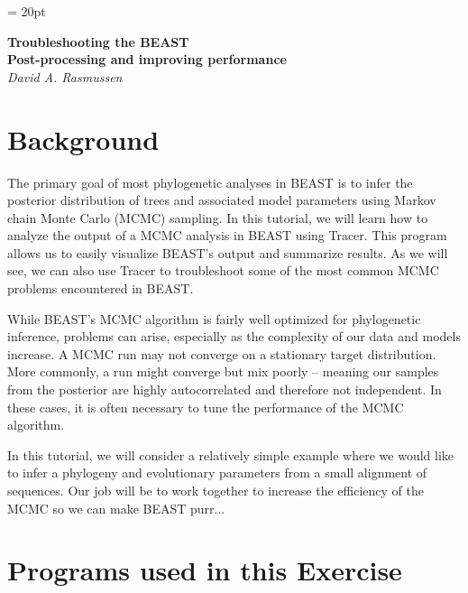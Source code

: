 \documentclass[11pt]{article}
\begin{document}
\renewcommand{\headrulewidth}{0.5pt}
\headsep = 20pt
\lhead{ }

\thispagestyle{plain}

\begin{center}
\textbf{\LARGE Troubleshooting the BEAST}\\\vspace{2mm}
\textbf{\textcolor{mycol}{\Large Post-processing and improving performance}}\\
\vspace{4mm}
{\Large {\em David A. Rasmussen}}
\end{center}

\bigskip
\section{Background}

The primary goal of most phylogenetic analyses in BEAST is to infer the posterior distribution of trees and associated model parameters using Markov chain Monte Carlo (MCMC) sampling. In this tutorial, we will learn how to analyze the output of a MCMC analysis in BEAST using Tracer. This program allows us to easily visualize BEAST's output and summarize results. As we will see, we can also use Tracer to troubleshoot some of the most common MCMC problems  encountered in BEAST.

While BEAST's MCMC algorithm is fairly well optimized for phylogenetic inference, problems can arise, especially as the complexity of our data and models increase. A MCMC run may not converge on a stationary target distribution. More commonly, a run might converge but mix poorly -- meaning our samples from the posterior are highly autocorrelated and therefore not independent. In these cases, it is often necessary to tune the performance of the MCMC algorithm.

In this tutorial, we will consider a relatively simple example where we would like to infer a phylogeny and evolutionary parameters from a small alignment of sequences.  Our job will be to work together to increase the efficiency of the MCMC so we can make BEAST purr...


\section{Programs used in this Exercise}\label{programsSec}

\end{document}
